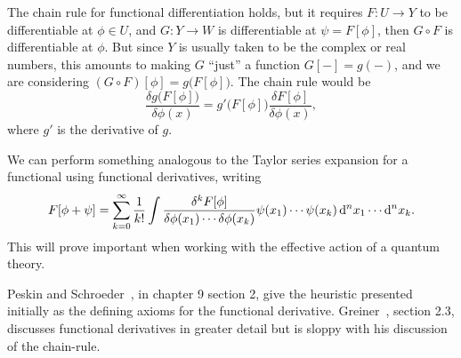 \begin{remark}
The chain rule for functional differentiation holds, but it requires
$F\colon U\to Y$ to be differentiable at $\phi\in U$, and $G\colon Y\to W$
is differentiable at $\psi=F[\phi]$, then $G\circ F$ is differentiable
at $\phi$. But since $Y$ is usually taken to be the complex or real
numbers, this amounts to making $G$ ``just'' a function $G[-]=g(-)$, and we are
considering $(G\circ F)[\phi] = g\bigl(F[\phi]\bigr)$. The chain rule
would be
\begin{equation}
\frac{\delta g\bigl(F[\phi]\bigr)}{\delta\phi(x)} = g'\bigl(F[\phi]\bigr)
\frac{\delta F[\phi]}{\delta\phi(x)},
\end{equation}
where $g'$ is the derivative of $g$.
\end{remark}

We can perform something analogous to the Taylor series expansion for a
functional using functional derivatives, writing
\begin{equation}
F[\phi + \psi] =\sum^{\infty}_{k=0}\frac{1}{k!}\int\frac{\delta^{k}F[\phi]}{\delta\phi(x_{1})\cdots\delta\phi(x_{k})}\psi(x_{1})\cdots\psi(x_{k})\,\mathrm{d}^{n}x_{1}\cdots\mathrm{d}^{n}x_{k}.
\end{equation}
This will prove important when working with the effective action of a
quantum theory.

Peskin and Schroeder~\cite{Peskin:1995ev}, in chapter 9 section 2, give
the heuristic presented initially as the defining axioms for the
functional derivative. Greiner~\cite{Greiner:1996zu}, section 2.3, discusses
functional derivatives in greater detail but is sloppy with his
discussion of the chain-rule.